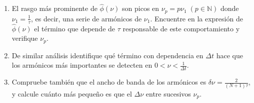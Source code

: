 \begin{enumerate}
	\item El rasgo más prominente de \(\hat{\phi }(\nu)\) son picos en \(\nu_p = p \nu_1 \; (p \in \mathbb{N})\) donde \(\nu_1 = \frac{1}{\tau}\), es decir, una serie de armónicos de \(\nu_1\).
	Encuentre en la expresión de \(\hat{\phi }(\nu)\) el término que depende de \(\tau\) responsable de este comportamiento y verifique \(\nu_p\). 
	
	\item De similar análisis identifique qué término con dependencia en \(\Delta t\) hace que los armónicos más importantes se detecten en \(0 < \nu < \frac{1}{\Delta t}\).

	\item Compruebe también que el ancho de banda de los armónicos es \(\delta \nu = \frac{2}{(N+1) \tau}\), y calcule cuánto más pequeño es que el $\Delta \nu$ entre sucesivos $\nu_p$.
\end{enumerate}



